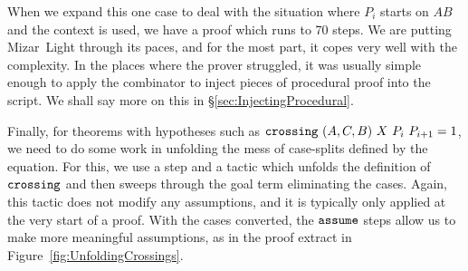 When we expand this one case to deal with the situation where $P_i$ starts on $AB$ and the context is used, we have a proof which runs to 70 steps. We are putting Mizar~Light through its paces, and for the most part, it copes very well with the complexity. In the places where the prover struggled, it was usually simple enough to apply the  combinator to inject pieces of procedural proof into the script. We shall say more on this in \S\ref{sec:InjectingProcedural}.




Finally, for theorems with hypotheses such as $\texttt{crossing}\ (A,C,B)\ X\ P_i\ P_{i+1} = 1$, we need to do some work in unfolding the mess of case-splits defined by the equation. For this, we use a  step and a tactic  which unfolds the definition of $\texttt{crossing}$ and then sweeps through the goal term eliminating the cases. Again, this tactic does not modify any assumptions, and it is typically only applied at the very start of a proof. With the cases converted, the $\texttt{assume}$ steps allow us to make more meaningful assumptions, as in the proof extract in Figure~\ref{fig:UnfoldingCrossings}.

